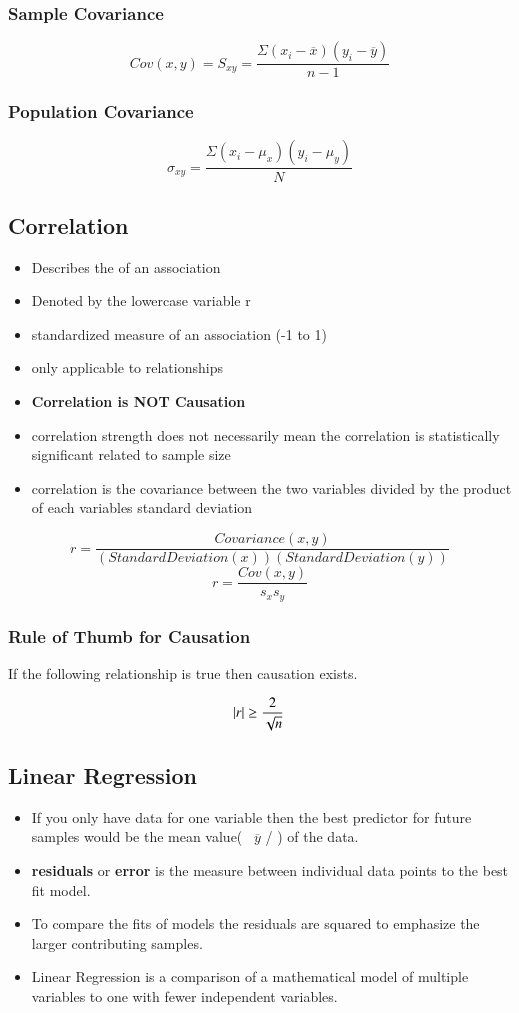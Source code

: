 \documentclass{article}
\begin{document}
\subsubsection{Sample Covariance}
\[ Cov(x,y) = S_{xy} = \frac{\Sigma(x_i - \overline{x})(y_i - \overline{y})}{n-1} \]

\subsubsection{Population Covariance}
\[ \sigma_{xy} = \frac{\Sigma(x_i - \mu_x)(y_i - \mu_y)}{N} \]

\subsection{Correlation}
\begin{itemize}
  \item Describes the {\color{red}{magnitude and direction}} of an association
  \item Denoted by the lowercase variable r
  \item standardized measure of an association (-1 to 1)
  \item only applicable to {\color{red}{LINEAR}} relationships
  \item \textbf{Correlation is NOT Causation}
  \item correlation strength does not necessarily mean the correlation is
    statistically significant related to sample size
  \item correlation is the covariance between the two variables divided by the
    product of each variables standard deviation
\end{itemize}

\[ r = \frac{Covariance(x,y)}{(Standard Deviation(x))(Standard Deviation(y))} \]
\[ r = \frac{Cov(x,y)}{s_xs_y} \]

\subsubsection{Rule of Thumb for Causation}
If the following relationship is true then causation exists.

\[ \abs{r} \geq \frac{2}{\sqrt{n}} \]

\subsection{Linear Regression}
\begin{itemize}
  \item If you only have data for one variable then the best predictor for
    future samples would be the mean value( \ $\overline{y}$ / ) of the data.
  \item \textbf{residuals} or \textbf{error} is the measure between individual
    data points to the best fit model.
  \item To compare the fits of models the residuals are squared to emphasize
    the larger contributing samples.
  \item Linear Regression is a comparison of a mathematical model of multiple
    variables to one with fewer independent variables.
\end{itemize}

\end{document}
